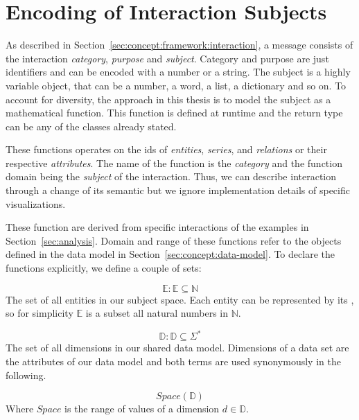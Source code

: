 \section{Encoding of Interaction Subjects}\label{sec:concept:message-interface}

As described in Section~\ref{sec:concept:framework:interaction}, a message consists of the interaction \emph{category}, \emph{purpose} and \emph{subject}.
Category and purpose are just identifiers and can be encoded with a number or a string.
The subject is a highly variable object, that can be a number, a word, a list, a dictionary and so on.
To account for diversity, the approach in this thesis is to model the subject as a mathematical function.
This function is defined at runtime and the return type can be any of the classes already stated.

These functions operates on the ids of \emph{entities}, \emph{series}, and \emph{relations} or their respective \emph{attributes}.
The name of the function is the \emph{category} and the function domain being the \emph{subject} of the interaction.
Thus, we can describe interaction through a change of its semantic but we ignore implementation details of specific visualizations.


These function are derived from specific interactions of the examples in Section~\ref{sec:analysis}.
Domain and range of these functions refer to the objects defined in the data model in Section~\ref{sec:concept:data-model}.
To declare the functions explicitly, we define a couple of sets:

\begin{equation} \mathbb{E} : \mathbb{E} \subseteq \mathbb{N}  \end{equation}
  The set of all entities in our subject space.
  Each entity can be represented by its , so for simplicity $\mathbb{E}$ is a subset all natural numbers in $\mathbb{N}$.

\begin{equation} \mathbb{D} : \mathbb{D} \subseteq \Sigma^* \end{equation}
  The set of all dimensions in our shared data model.
  Dimensions of a data set are the attributes of our data model and both terms are used synonymously in the following.

\begin{equation} Space(\mathbb{D}) \end{equation}
  Where $Space$ is the range of values of a dimension $d \in \mathbb{D}$.

